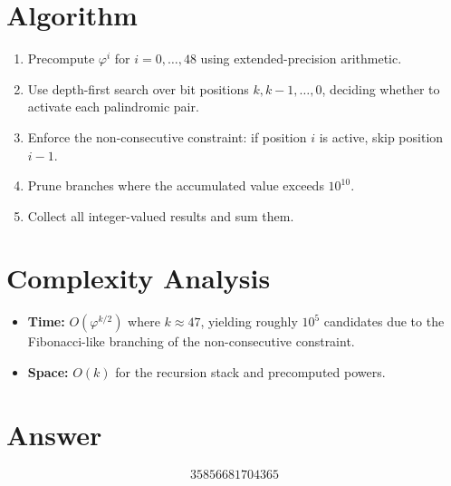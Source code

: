 \documentclass[11pt]{article}
\begin{document}
\section{Algorithm}
\begin{enumerate}
    \item Precompute $\varphi^i$ for $i = 0, \ldots, 48$ using extended-precision arithmetic.
    \item Use depth-first search over bit positions $k, k-1, \ldots, 0$, deciding whether to activate each palindromic pair.
    \item Enforce the non-consecutive constraint: if position $i$ is active, skip position $i-1$.
    \item Prune branches where the accumulated value exceeds $10^{10}$.
    \item Collect all integer-valued results and sum them.
\end{enumerate}

\section{Complexity Analysis}
\begin{itemize}
    \item \textbf{Time:} $O(\varphi^{k/2})$ where $k \approx 47$, yielding roughly $10^5$ candidates due to the Fibonacci-like branching of the non-consecutive constraint.
    \item \textbf{Space:} $O(k)$ for the recursion stack and precomputed powers.
\end{itemize}

\section{Answer}

\[
\boxed{35856681704365}
\]
\end{document}
